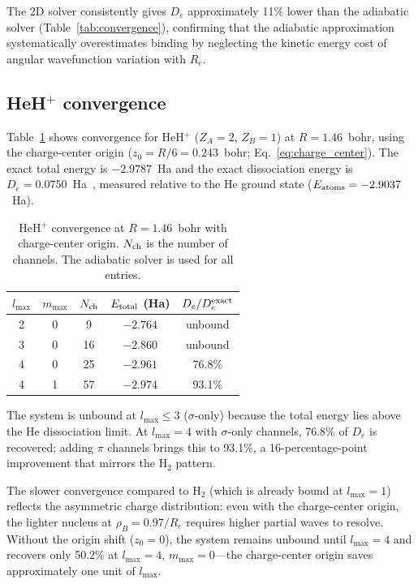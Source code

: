 \documentclass[aps,pra,twocolumn,superscriptaddress,longbibliography]{revtex4-2}
\begin{document}
The 2D solver consistently gives $D_e$ approximately 11\% lower
than the adiabatic solver (Table~\ref{tab:convergence}), confirming
that the adiabatic approximation systematically overestimates binding
by neglecting the kinetic energy cost of angular wavefunction
variation with $R_e$.

\subsection{HeH\texorpdfstring{$^+$}{+} convergence}
\label{sec:heh_results}

Table~\ref{tab:heh_convergence} shows convergence for
HeH$^+$ ($Z_A = 2$, $Z_B = 1$) at $R = 1.46$~bohr,
using the charge-center origin
($z_0 = R/6 = 0.243$~bohr; Eq.~\ref{eq:charge_center}).
The exact total energy is $-2.9787$~Ha and the exact
dissociation energy is $D_e = 0.0750$~Ha~\cite{bishop1977},
measured relative to the He ground state
($E_{\rm atoms} = -2.9037$~Ha).

\begin{table}[h]
\caption{HeH$^+$ convergence at $R = 1.46$~bohr with
charge-center origin.  $N_{\rm ch}$ is the number of channels.
The adiabatic solver is used for all entries.}
\label{tab:heh_convergence}
\begin{ruledtabular}
\begin{tabular}{ccccc}
$l_{\max}$ & $m_{\max}$ & $N_{\rm ch}$ &
  $E_{\rm total}$ (Ha) & $D_e / D_e^{\rm exact}$ \\
\hline
2 & 0 &  9 & $-2.764$ & unbound \\
3 & 0 & 16 & $-2.860$ & unbound \\
4 & 0 & 25 & $-2.961$ & 76.8\% \\
4 & 1 & 57 & $-2.974$ & 93.1\% \\
\end{tabular}
\end{ruledtabular}
\end{table}

The system is unbound at $l_{\max} \le 3$ ($\sigma$-only) because
the total energy lies above the He dissociation limit.  At
$l_{\max} = 4$ with $\sigma$-only channels, 76.8\% of $D_e$
is recovered; adding $\pi$ channels brings this to 93.1\%,
a 16-percentage-point improvement that mirrors the H$_2$ pattern.

The slower convergence compared to H$_2$ (which is already
bound at $l_{\max} = 1$) reflects the asymmetric charge
distribution: even with the charge-center origin, the lighter
nucleus at $\rho_B = 0.97/R_e$ requires higher partial waves
to resolve.  Without the origin shift ($z_0 = 0$), the system
remains unbound until $l_{\max} = 4$ and recovers only 50.2\%
at $l_{\max} = 4$, $m_{\max} = 0$---the charge-center origin
saves approximately one unit of $l_{\max}$.
\end{document}
